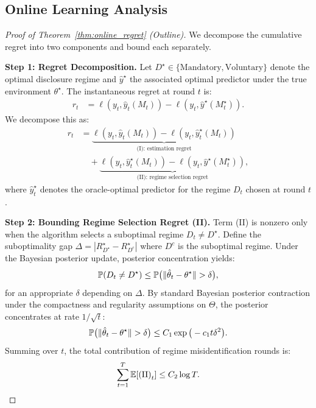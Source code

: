 \subsection{Online Learning Analysis}
\label{app:online_learning}

\begin{proof}[Proof of Theorem~\ref{thm:online_regret} (Outline)]
We decompose the cumulative regret into two components and bound each separately.

\textbf{Step 1: Regret Decomposition.}
Let $D^\star \in \{\text{Mandatory}, \text{Voluntary}\}$ denote the optimal disclosure regime and $\hat{y}^\star$ the associated optimal predictor under the true environment $\theta^\star$. The instantaneous regret at round $t$ is:
\begin{align*}
  r_t &= \ell(y_t, \hat{y}_t(M_t)) - \ell(y_t, \hat{y}^\star(M_t^\star)).
\end{align*}
We decompose this as:
\begin{align*}
  r_t &= \underbrace{\ell(y_t, \hat{y}_t(M_t)) - \ell(y_t, \hat{y}^\star_t(M_t))}_{\text{(I): estimation regret}} \\
  &\quad + \underbrace{\ell(y_t, \hat{y}^\star_t(M_t)) - \ell(y_t, \hat{y}^\star(M_t^\star))}_{\text{(II): regime selection regret}},
\end{align*}
where $\hat{y}^\star_t$ denotes the oracle-optimal predictor for the regime $D_t$ chosen at round $t$.

\textbf{Step 2: Bounding Regime Selection Regret (II).}
Term (II) is nonzero only when the algorithm selects a suboptimal regime $D_t \neq D^\star$. Define the suboptimality gap $\Delta = |R_{D^\star}^\star - R_{D^c}^\star|$ where $D^c$ is the suboptimal regime. Under the Bayesian posterior update, posterior concentration yields:
\begin{equation*}
  \mathbb{P}(D_t \neq D^\star) \le \mathbb{P}\big(\|\hat{\theta}_t - \theta^\star\| > \delta\big),
\end{equation*}
for an appropriate $\delta$ depending on $\Delta$. By standard Bayesian posterior contraction under the compactness and regularity assumptions on $\Theta$, the posterior concentrates at rate $1/\sqrt{t}$:
\begin{equation*}
  \mathbb{P}\big(\|\hat{\theta}_t - \theta^\star\| > \delta\big) \le C_1 \exp\big(-c_1 t \delta^2\big).
\end{equation*}
Summing over $t$, the total contribution of regime misidentification rounds is:
\begin{equation*}
  \sum_{t=1}^T \mathbb{E}[\text{(II)}_t] \le C_2 \log T.
\end{equation*}


\end{proof}
